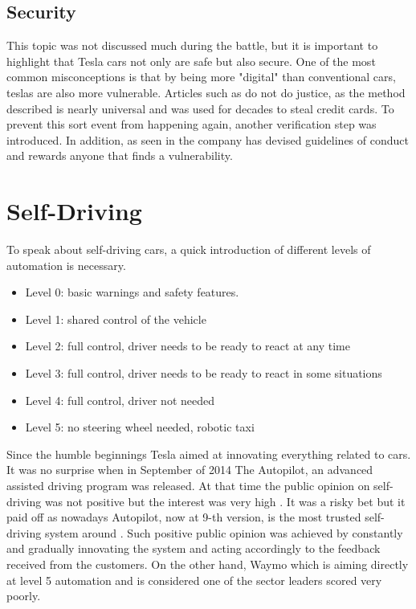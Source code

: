 \documentclass{article} %
\begin{document}
\subsection{Security}
This topic was not discussed much during the battle, but it is important to highlight that Tesla cars not only are safe but also secure.
\newline One of the most common misconceptions is that by being more "digital" than conventional cars, teslas are also more vulnerable.
Articles such as \cite{Security:Theft} do not do justice, as the method described is nearly universal and was used for decades to steal credit cards. To prevent this sort event from happening again, another verification step was introduced.
\newline In addition, as seen in \cite{Security:Methods} the company has devised guidelines of conduct and rewards anyone that finds a vulnerability.
\section{Self-Driving} %
To speak about self-driving cars, a quick introduction of different levels of automation is necessary.
\begin{itemize}
    \item Level 0: basic warnings and safety features.
    \item Level 1: shared control of the vehicle
    \item Level 2: full control, driver needs to be ready to react at any time
    \item Level 3: full control,  driver needs to be ready to react in some situations
    \item Level 4: full control,  driver not needed
    \item Level 5: no steering wheel needed, robotic taxi
\end{itemize}
Since the humble beginnings Tesla aimed at innovating everything related to cars.
It was no surprise when in September of 2014 The Autopilot, an advanced assisted driving program was released. At that time the public opinion on self-driving was not positive but the interest was very high \cite{Pilot:Opinion}. It was a risky bet but it paid off as nowadays Autopilot, now at 9-th version, is the most trusted self-driving system around \cite{Pilot:Trust}.
Such positive public opinion was achieved by constantly and gradually innovating the system and acting accordingly to the feedback received from the customers.
On the other hand, Waymo which is aiming directly at level 5 automation and is considered one of the sector leaders scored very poorly.
\end{document}
